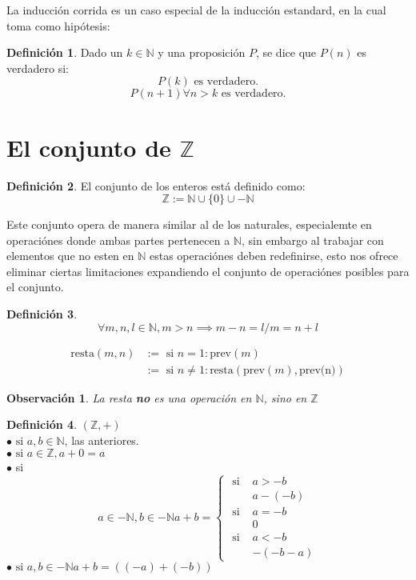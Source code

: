 \documentclass[9pt,a4paper,draft]{article}
\theoremstyle{definition}
\newtheorem{defi}{Definición}
\theoremstyle{plain}
\newtheorem{obs}{Observación}
\begin{document}
La inducción corrida es un caso especial de la inducción estandard, en la cual toma como hipótesis:

\begin{defi} Dado un $k\in{\mathbb{N}}$ y una proposición $P$, se dice que $P(n)$ es verdadero si:\\
$$P(k) \text{ es verdadero.}$$
$$P(n+1) \forall{n>k} \text{ es verdadero.}$$
\end{defi}

\section{El conjunto de $\mathbb{Z}$}

\begin{defi} El conjunto de los enteros está definido como:\\
$$\mathbb{Z}:= \mathbb{N}\cup{\{0\}\cup{-\mathbb{N}}}$$\end{defi}

Este conjunto opera de manera similar al de los naturales, especialemte en operaciónes donde ambas partes pertenecen a $\mathbb{N}$, sin embargo al trabajar con elementos que no esten en $\mathbb{N}$ estas operaciónes deben redefinirse, esto nos ofrece eliminar ciertas limitaciones expandiendo el conjunto de operaciónes posibles para el conjunto.

\begin{defi} $$\forall{m,n,l}\in{\mathbb{N}}, m>n\implies m-n=l / m=n+l$$

\begin{align*}
\text{resta}(m,n) &:= \text{ si } n=1: \text{prev}(m)\\
                  &:= \text{ si } n\neq{1}: \text{resta}(\text{prev}(m), \text{prev(n)})
\end{align*}
\end{defi}

\begin{obs}La resta {\bfseries no} es una operación en $\mathbb{N}$, sino en $\mathbb{Z}$\end{obs}

\begin{defi}$(\mathbb{Z}, +)$\\
$\bullet \text{ si }a,b\in{\mathbb{N}}$, las anteriores.\\
$\bullet \text{ si }a\in{\mathbb{Z}}, a+0=a$ \\
$\bullet$ si \[a\in{-\mathbb{N}}, b\in{-\mathbb{N}} a+b=
\begin{cases}
\text{ si } & a>-b\\
            &a-(-b)\\
\text{ si } &a=-b\\
            &0\\
\text{ si } &a<-b\\
            &-(-b-a)
\end{cases}
\]
$\bullet \text{ si }a,b\in{-\mathbb{N}} a+b=((-a)+(-b))$
\end{defi}
\end{document}

